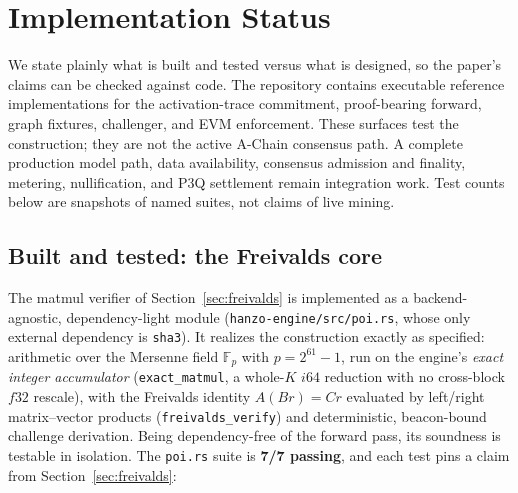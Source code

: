 \section{Implementation Status}
\label{sec:impl-status}

We state plainly what is built and tested versus what is designed, so the paper's claims
can be checked against code. The repository contains executable reference implementations
for the activation-trace commitment, proof-bearing forward, graph fixtures, challenger,
and EVM enforcement. These surfaces test the construction; they are not the active A-Chain
consensus path. A complete production model path, data availability, consensus admission
and finality, metering, nullification, and P3Q settlement remain integration work. Test
counts below are snapshots of named suites, not claims of live mining.

\subsection{Built and tested: the Freivalds core}

The matmul verifier of Section~\ref{sec:freivalds} is implemented as a backend-agnostic,
dependency-light module (\texttt{hanzo-engine/src/poi.rs}, whose only external dependency
is \texttt{sha3}). It realizes the construction exactly as specified: arithmetic over the
Mersenne field $\mathbb{F}_p$ with $p = 2^{61}-1$, run on the engine's \emph{exact integer
accumulator} (\texttt{exact\_matmul}, a whole-$K$ $i64$ reduction with no cross-block
$f32$ rescale), with the Freivalds identity $A(Br) = Cr$ evaluated by left/right
matrix--vector products (\texttt{freivalds\_verify}) and deterministic, beacon-bound
challenge derivation. Being dependency-free of the forward pass, its soundness is testable
in isolation. The \texttt{poi.rs} suite is \textbf{7/7 passing}, and each test pins a claim
from Section~\ref{sec:freivalds}:

